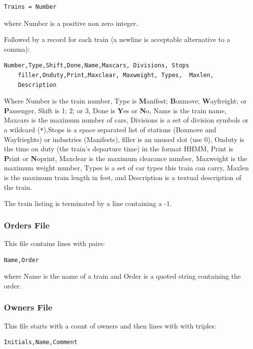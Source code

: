 \begin{verbatim}
Trains = Number
\end{verbatim}

where Number is a positive non zero integer.

Followed by a record for each train (a newline is acceptable alternative
to a comma):

{\footnotesize
\begin{verbatim}
Number,Type,Shift,Done,Name,Maxcars, Divisions, Stops
	filler,Onduty,Print,Maxclear, Maxweight, Types,  Maxlen, 
	Description
\end{verbatim}
}

Where Number is the train number, Type is \textbf{M}anifest;
\textbf{B}oxmove; \textbf{W}ayfreight; or \textbf{P}assenger, Shift is
1; 2; or 3, Done is \textbf{Y}es or \textbf{N}o, Name is the train
name, Maxcars is the maximum number of cars, Divisions is a set of
division symbols or a wildcard (\verb=*=),Stops is a space separated
list of stations (Boxmove and Wayfrieghts) or industries (Manifests),
filler is an unused slot (use 0), Onduty is the time on duty (the
train's departure time) in the format HHMM, Print is \textbf{P}rint or
\textbf{N}oprint, Maxclear is the maximum clearance number, Maxweight
is the maximum weight number, Types is a set of car types this train
can carry, Maxlen is the maximum train length in feet, and Description
is a textual description of the train.

The train listing is terminated by a line containing a -1.

\subsubsection{Orders File}

This file contains lines with pairs:

\begin{verbatim}
Name,Order
\end{verbatim}

where Name is the name of a train and Order is a quoted string
containing the order.

\subsubsection{Owners File}

This file starts with a count of owners and then lines with with
triples:

\begin{verbatim}
Initials,Name,Comment
\end{verbatim}

